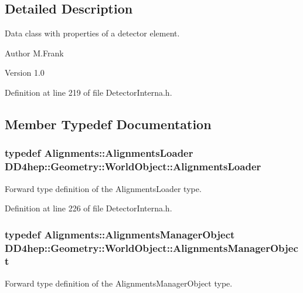 \subsection{Detailed Description}
Data class with properties of a detector element. \begin{DoxyAuthor}{Author}
M.Frank 
\end{DoxyAuthor}
\begin{DoxyVersion}{Version}
1.0 
\end{DoxyVersion}


Definition at line 219 of file DetectorInterna.h.

\subsection{Member Typedef Documentation}
\hypertarget{class_d_d4hep_1_1_geometry_1_1_world_object_a30113114fd4d57fb10e2c39c484813c3}{
\subsubsection[{AlignmentsLoader}]{\setlength{\rightskip}{0pt plus 5cm}typedef {\bf Alignments::AlignmentsLoader} {\bf DD4hep::Geometry::WorldObject::AlignmentsLoader}}}
\label{class_d_d4hep_1_1_geometry_1_1_world_object_a30113114fd4d57fb10e2c39c484813c3}


Forward type definition of the AlignmentsLoader type. 

Definition at line 226 of file DetectorInterna.h.\hypertarget{class_d_d4hep_1_1_geometry_1_1_world_object_ac5c3ed360e547df41b814ee0c5fddf9f}{
\subsubsection[{AlignmentsManagerObject}]{\setlength{\rightskip}{0pt plus 5cm}typedef {\bf Alignments::AlignmentsManagerObject} {\bf DD4hep::Geometry::WorldObject::AlignmentsManagerObject}}}
\label{class_d_d4hep_1_1_geometry_1_1_world_object_ac5c3ed360e547df41b814ee0c5fddf9f}


Forward type definition of the AlignmentsManagerObject type. 

